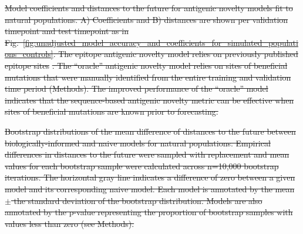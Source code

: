 \documentclass[9pt,lineno]{elife} %
\providecommand{\DIFdel}[1]{{\protect\color{red}\sout{#1}}}                      %
\providecommand{\DIFdelFL}[1]{\DIFdel{#1}} %
\providecommand{\DIFdeltex}[1]{{\protect\color{red}\sout{#1}}}                      %
\providecommand{\DIFdelFL}[1]{\DIFdel{#1}} %
\providecommand{\DIFdel}[1]{\texorpdfstring{\DIFdeltex{#1}}{}} %
\begin{document}
{%
\DIFdelFL{Model coefficients and distances to the future for antigenic novelty models fit to natural populations.
  A) Coefficients and B) distances are shown per validation timepoint and test timepoint as in Fig.~\ref{fig:unadjusted_model_accuracy_and_coefficients_for_simulated_populations_controls}.
  The epitope antigenic novelty model relies on previously published epitope sites }%
\DIFdelFL{.
  The ``oracle'' antigenic novelty model relies on sites of beneficial mutations that were manually identified from the entire training and validation time period (Methods).
  The improved performance of the ``oracle'' model indicates that the sequence-based antigenic novelty metric can be effective when sites of beneficial mutations are known prior to forecasting.
  }}

{%
\DIFdelFL{Bootstrap distributions of the mean difference of distances to the future between biologically-informed and naive models for natural populations.
  Empirical differences in distances to the future were sampled with replacement and mean values for each bootstrap sample were calculated across n=10,000 bootstrap iterations.
  The horizontal gray line indicates a difference of zero between a given model and its corresponding naive model.
  Each model is annotated by the mean $\pm$ the standard deviation of the bootstrap distribution.
  Models are also annotated by the p-value representing the proportion of bootstrap samples with values less than zero (see Methods).
  }}
\end{document}
